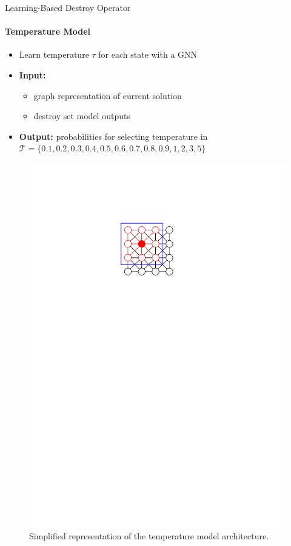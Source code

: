 \documentclass[aspectratio=1610]{beamer}
\newcommand{\important}[1]{{\color{green!60!black}#1}}
\begin{document}
\begin{frame}{Learning-Based Destroy Operator}
	\framesubtitle{Temperature Model}
	\begin{itemize}
		\item \important{Learn} temperature $\tau$ for each state with a GNN
		\item \textbf{Input:} 
		\begin{itemize}
			\item graph representation of \important{current solution}
			\item destroy set model \important{outputs}
		\end{itemize}
		\item \textbf{Output:} \important{probabilities} for selecting temperature in $\mathcal{T} = \{ 0.1, 0.2, 0.3, 0.4, 0.5, 0.6, 0.7, 0.8, 0.9, 1, 2, 3, 5 \}$
	\end{itemize}
	\begin{figure}
		\centering\includegraphics[width=\textwidth, page=5]{figures/graphics.pdf}
		\caption{Simplified representation of  the temperature model architecture.}
	\end{figure}
\end{frame}
\end{document}
